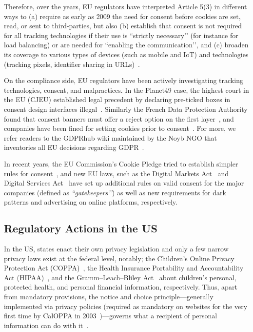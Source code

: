 Therefore, over the years, EU regulators have interpreted Article 5(3) in different ways to (a) require as early as 2009 the need for consent before cookies are set, read, or sent to third-parties, but also (b) establish that consent is not required for all tracking technologies if their use is ``strictly necessary’’ (for instance for load balancing) or are needed for ``enabling the communication’’, and (c) broaden its coverage to various types of devices (such as mobile and IoT) and technologies (tracking pixels, identifier sharing in URLs)~\cite{Guidelines22023}. 

On the compliance side, EU regulators have been actively investigating tracking technologies, consent, and malpractices. In the Planet49 case, the highest court in the EU (CJEU) established legal precedent by declaring pre-ticked boxes in consent design interfaces illegal~\cite{CJEUC67317}. Similarly the French Data Protection Authority found that consent banners must offer a reject option on the first layer~\cite{ClosureInjunctionIssued2023,CNILFranceSAN2021024}, and companies have been fined for setting cookies prior to consent~\cite{CNILFranceSAN2020012,DeliberationSAN20200127}. For more, we refer readers to the GDPRhub wiki maintained by the Noyb NGO that inventories all EU decisions regarding GDPR~\cite{GDPRhub}.

In recent years, the EU Commission’s Cookie Pledge tried to establish simpler rules for consent~\cite{europeancommissionCookiePledgeEuropean2023}, and new EU laws, such as the Digital Markets Act~\cite{RegulationEU20222022} and Digital Services Act~\cite{RegulationEU20222022a} have set up additional rules on valid consent for the major companies (defined as \textit{``gatekeepers’’}) as well as new requirements for dark patterns and advertising on online platforms, respectively.

\subsection{Regulatory Actions in the US}
\label{sec:us-regulations}

In the US, states enact their own privacy legislation and only a few narrow privacy laws exist at the federal level, notably; the Children’s Online Privacy Protection Act (COPPA)~\cite{ChildrensOnlinePrivacy2013}, the Health Insurance Portability and Accountability Act (HIPAA)~\cite{rightsocrHIPAAPrivacyRule2008}, and the Gramm–Leach–Bliley Act~\cite{GrammLeachBlileyAct2013} about children’s personal, protected health, and personal financial information, respectively. Thus, apart from mandatory provisions, the notice and choice principle---generally implemented via privacy policies (required as mandatory on websites for the very first time by CalOPPA in 2003~\cite{CaliforniaCodeBPC2003})---governs what a recipient of personal information can do with it~\cite{zimmeckInformationPrivacyLaw2013}.

